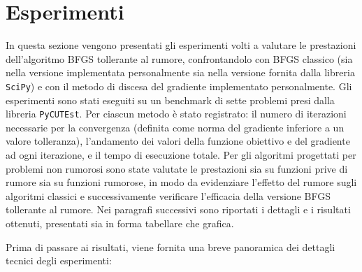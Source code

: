 \section{Esperimenti}\label{sec:esperimenti}
In questa sezione vengono presentati gli esperimenti volti a valutare le prestazioni dell’algoritmo BFGS tollerante al rumore, confrontandolo con BFGS classico (sia nella versione implementata personalmente sia nella versione fornita dalla libreria \texttt{SciPy}) e con il metodo di discesa del gradiente implementato personalmente. Gli esperimenti sono stati eseguiti su un benchmark di sette problemi presi dalla libreria \texttt{PyCUTEst}.
Per ciascun metodo è stato registrato: il numero di iterazioni necessarie per la convergenza (definita come norma del gradiente inferiore a un valore tolleranza), l’andamento dei valori della funzione obiettivo e del gradiente ad ogni iterazione, e il tempo di esecuzione totale.
Per gli algoritmi progettati per problemi non rumorosi sono state valutate le prestazioni sia su funzioni prive di rumore sia su funzioni rumorose, in modo da evidenziare l’effetto del rumore sugli algoritmi classici e successivamente verificare l’efficacia della versione BFGS tollerante al rumore. Nei paragrafi successivi sono riportati i dettagli e i risultati ottenuti, presentati sia in forma tabellare che grafica.

Prima di passare ai risultati, viene fornita una breve panoramica dei dettagli tecnici degli esperimenti:

